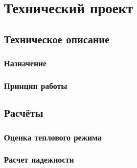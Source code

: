 \chapter{Технический проект}
	\section{Техническое описание}
		\subsection{Назначение}
		\subsection{Принцип работы}
	\section{Расчёты}
		\subsection{Оценка теплового режима}
		\subsection{Расчет надежности}
